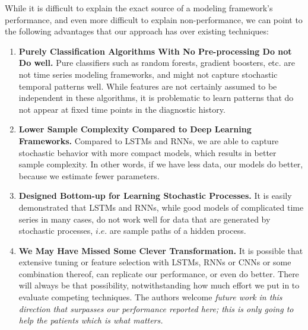 \documentclass[3p,super,numbers,sort&compress,preprint,10pt]{elsarticle}
\begin{document}
  While it is difficult to explain the exact source of a modeling framework's performance, and even more difficult to explain  non-performance, we can point to the following advantages that our approach has over existing techniques:
  \begin{enumerate}
    \item \textbf{Purely Classification Algorithms With No Pre-processing Do not Do well.} Pure classifiers such as random forests, gradient boosters, etc. are not time series modeling frameworks, and might not capture stochastic temporal patterns well. While features are not certainly assumed to be independent in these algorithms, it is problematic to learn patterns that do not appear at fixed time points in the diagnostic history.
  \item \textbf{Lower Sample Complexity Compared to Deep Learning Frameworks.} Compared to LSTMs and RNNs, we are able to capture stochastic behavior with more compact models, which results in  better sample complexity. In other words, if we have less data, our models do better, because we estimate fewer parameters.
  \item \textbf{Designed Bottom-up for Learning Stochastic Processes.} It is easily demonstrated that LSTMs and RNNs, while good models of complicated time series in many cases, do not work well for data that are generated by stochastic processes, $i.e.$ are sample paths of a hidden process.
    \item \textbf{We May Have  Missed Some Clever Transformation.} It is possible that extensive tuning or feature selection with LSTMs, RNNs or CNNs or some combination thereof, can replicate our performance, or even do better. There will always be that possibility, notwithstanding how much effort we put in to evaluate competing techniques. The authors welcome  \textit{future work in this direction that surpasses our  performance reported here; this  is only going to help the patients  which is what  matters.}
  \end{enumerate}
%
\end{document}
